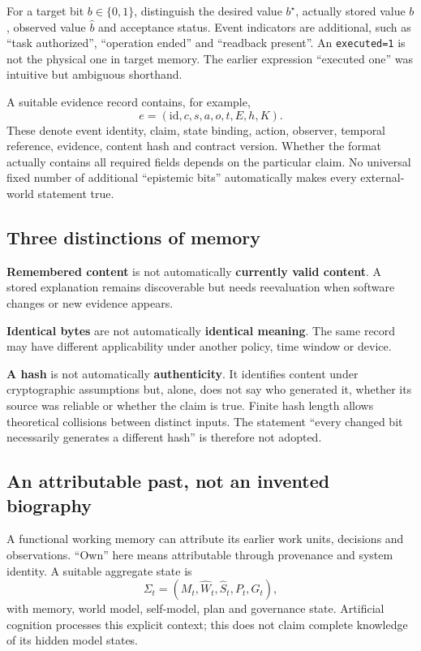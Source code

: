 \begin{cols}
For a target bit $b\in\{0,1\}$, distinguish the desired value $b^\star$, actually stored value $b$, observed value $\hat b$ and acceptance status. Event indicators are additional, such as ``task authorized'', ``operation ended'' and ``readback present''. An \texttt{executed=1} is not the physical one in target memory. The earlier expression ``executed one'' was intuitive but ambiguous shorthand. 

A suitable evidence record contains, for example,
\[
 e=(\mathrm{id},c,s,a,o,t,E,h,K).
\]
These denote event identity, claim, state binding, action, observer, temporal reference, evidence, content hash and contract version. Whether the format actually contains all required fields depends on the particular claim. No universal fixed number of additional ``epistemic bits'' automatically makes every external-world statement true.

\subsection*{Three distinctions of memory}
\textbf{Remembered content} is not automatically \textbf{currently valid content}. A stored explanation remains discoverable but needs reevaluation when software changes or new evidence appears.

\textbf{Identical bytes} are not automatically \textbf{identical meaning}. The same record may have different applicability under another policy, time window or device.

\textbf{A hash} is not automatically \textbf{authenticity}. It identifies content under cryptographic assumptions but, alone, does not say who generated it, whether its source was reliable or whether the claim is true. Finite hash length allows theoretical collisions between distinct inputs. The statement ``every changed bit necessarily generates a different hash'' is therefore not adopted.

\subsection*{An attributable past, not an invented biography}
A functional working memory can attribute its earlier work units, decisions and observations. ``Own'' here means attributable through provenance and system identity. A suitable aggregate state is
\[
 \Sigma_t=(M_t,\widehat W_t,\widehat S_t,P_t,G_t),
\]
with memory, world model, self-model, plan and governance state. Artificial cognition processes this explicit context; this does not claim complete knowledge of its hidden model states.


\end{cols}
